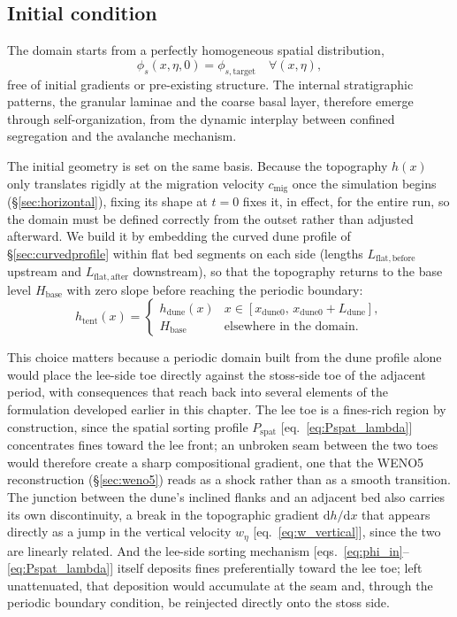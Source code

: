 \documentclass[lineno]{JFM-FLM_Au}
\begin{document}
\subsection{Initial condition}
\label{sec:ic}

The domain starts from a perfectly homogeneous spatial distribution,
\begin{equation}
    \phi_s(x,\eta,0) = \phi_{s,\mathrm{target}} \quad \forall (x,\eta),
    \label{eq:ic}
\end{equation}
free of initial gradients or pre-existing structure. The internal stratigraphic patterns, the granular laminae and the coarse basal layer, therefore emerge through self-organization, from the dynamic interplay between confined segregation and the avalanche mechanism.

The initial geometry is set on the same basis. Because the topography $h(x)$ only translates rigidly at the migration velocity $c_{\mathrm{mig}}$ once the simulation begins (\S\ref{sec:horizontal}), fixing its shape at $t=0$ fixes it, in effect, for the entire run, so the domain must be defined correctly from the outset rather than adjusted afterward. We build it by embedding the curved dune profile of \S\ref{sec:curvedprofile} within flat bed segments on each side (lengths $L_{\mathrm{flat,before}}$ upstream and $L_{\mathrm{flat,after}}$ downstream), so that the topography returns to the base level $H_{\mathrm{base}}$ with zero slope before reaching the periodic boundary:
\begin{equation}
    h_{\mathrm{tent}}(x) =
    \begin{cases}
        h_{\mathrm{dune}}(x) & x \in [x_{\mathrm{dune}0},\, x_{\mathrm{dune}0}+L_{\mathrm{dune}}], \\
        H_{\mathrm{base}} & \text{elsewhere in the domain.}
    \end{cases}
    \label{eq:htent}
\end{equation}

This choice matters because a periodic domain built from the dune profile alone would place the lee-side toe directly against the stoss-side toe of the adjacent period, with consequences that reach back into several elements of the formulation developed earlier in this chapter. The lee toe is a fines-rich region by construction, since the spatial sorting profile $P_{\mathrm{spat}}$ [eq.~\eqref{eq:Pspat_lambda}] concentrates fines toward the lee front; an unbroken seam between the two toes would therefore create a sharp compositional gradient, one that the WENO5 reconstruction (\S\ref{sec:weno5}) reads as a shock rather than as a smooth transition. The junction between the dune's inclined flanks and an adjacent bed also carries its own discontinuity, a break in the topographic gradient $\mathrm{d}h/\mathrm{d}x$ that appears directly as a jump in the vertical velocity $w_\eta$ [eq.~\eqref{eq:w_vertical}], since the two are linearly related. And the lee-side sorting mechanism [eqs.~\eqref{eq:phi_in}--\eqref{eq:Pspat_lambda}] itself deposits fines preferentially toward the lee toe; left unattenuated, that deposition would accumulate at the seam and, through the periodic boundary condition, be reinjected directly onto the stoss side.
\end{document}
